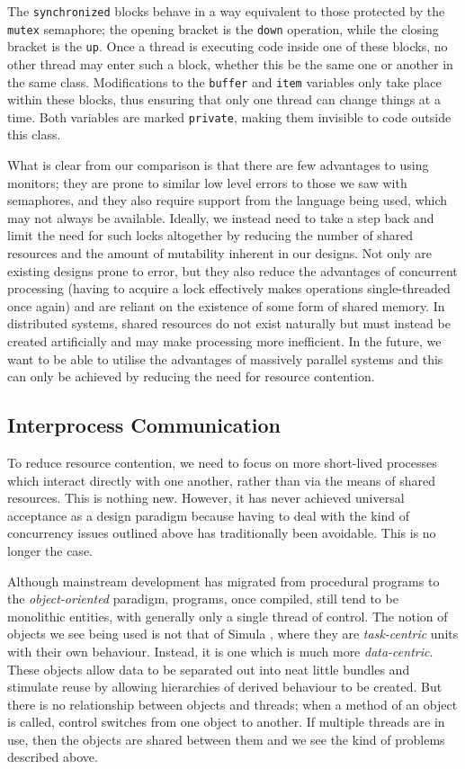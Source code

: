 The \texttt{synchronized} blocks behave in a way equivalent to those
protected by the \texttt{mutex} semaphore; the opening bracket is the
\texttt{down} operation, while the closing bracket is the \texttt{up}.
Once a thread is executing code inside one of these blocks, no other
thread may enter such a block, whether this be the same one or another
in the same class.  Modifications to the \texttt{buffer} and
\texttt{item} variables only take place within these blocks, thus
ensuring that only one thread can change things at a time.  Both
variables are marked \texttt{private}, making them invisible to code
outside this class.

What is clear from our comparison is that there are few advantages to
using monitors; they are prone to similar low level errors to those we
saw with semaphores, and they also require support from the language
being used, which may not always be available.  Ideally, we instead
need to take a step back and limit the need for such locks altogether
by reducing the number of shared resources and the amount of
mutability inherent in our designs.  Not only are existing designs
prone to error, but they also reduce the advantages of concurrent
processing (having to acquire a lock effectively makes operations
single-threaded once again) and are reliant on the existence of some
form of shared memory.  In distributed systems, shared resources do
not exist naturally but must instead be created artificially and may
make processing more inefficient.  In the future, we want to be able
to utilise the advantages of massively parallel systems and this can
only be achieved by reducing the need for resource contention.

\subsection{Interprocess Communication}
\label{ipc}

To reduce resource contention, we need to focus on more short-lived
processes which interact directly with one another, rather than via
the means of shared resources.  This is nothing new.  However, it has
never achieved universal acceptance as a design paradigm because
having to deal with the kind of concurrency issues outlined above has
traditionally been avoidable.  This is no longer the case.

Although mainstream development has migrated from procedural programs
to the \emph{object-oriented} paradigm, programs, once compiled, still
tend to be monolithic entities, with generally only a single thread of
control.  The notion of objects we see being used is not that of
Simula \cite{simula}, where they are \emph{task-centric} units with
their own behaviour.  Instead, it is one which is much more
\emph{data-centric}.  These objects allow data to be separated out
into neat little bundles and stimulate reuse by allowing hierarchies
of derived behaviour to be created.  But there is no relationship
between objects and threads; when a method of an object is called,
control switches from one object to another.  If multiple threads are
in use, then the objects are shared between them and we see the kind
of problems described above.

